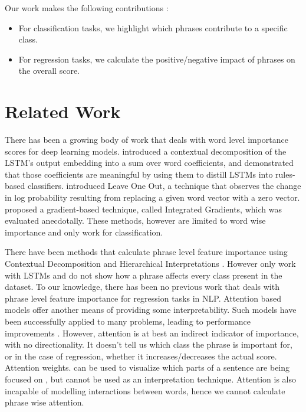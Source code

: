 \documentclass[11pt]{article}
\begin{document}
Our work makes the following contributions :

\begin{itemize}

\item For classification tasks, we highlight which phrases contribute to a specific class.

\item For regression tasks, we calculate the positive/negative impact of phrases on the overall score.

\end{itemize}




\section{Related Work}
\label{intro}

There has been a growing body of work that deals with word level importance scores for deep learning models.  \cite{murdoch2018beyond} introduced a contextual decomposition of the LSTM’s output embedding into a sum over word coefficients, and demonstrated that those coefficients are meaningful by using them to distill LSTMs into rules-based classifiers. \cite{li2016understanding} introduced Leave One Out, a technique that observes the change in log probability resulting from replacing a given word vector with a zero vector. \cite{sundararajan2017axiomatic} proposed a gradient-based technique, called Integrated Gradients, which was evaluated anecdotally. These methods, however are limited to word wise importance and only work for classification.

There have been methods that calculate phrase level feature importance using Contextual Decomposition \cite{murdoch2018beyond} and Hierarchical Interpretations \cite{singh2018hierarchical}. However  only work with LSTMs and  do not show how a phrase affects every class present in the dataset. To our knowledge, there has been no previous work that deals with phrase level feature importance for regression tasks in NLP.
Attention based models \cite{bahdanau2014neural} offer another means of providing some interpretability. Such models have been successfully applied to many problems, leading to performance improvements \cite{strobelt2017lstmvis} . However, attention is at best an indirect indicator of importance, with no directionality. It doesn't tell us which class the phrase is important for, or in the case of regression, whether it increases/decreases the actual score. Attention weights. can be used to visualize which parts of a sentence are being focused on , but cannot be used as an interpretation technique.  Attention is also incapable of modelling interactions between words, hence we cannot calculate phrase wise attention.
\end{document}
